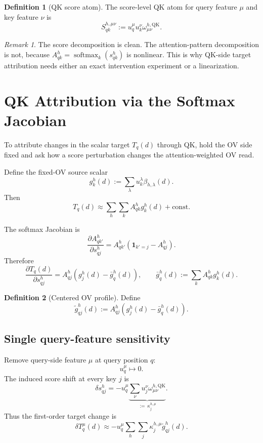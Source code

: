 \documentclass[11pt]{article}
\newcommand{\softmax}{\operatorname{softmax}}
\newcommand{\QK}{\mathrm{QK}}
\theoremstyle{definition}
\newtheorem{definition}{Definition}
\theoremstyle{plain}
\theoremstyle{remark}
\newtheorem{remark}{Remark}
\begin{document}
\begin{definition}[QK score atom]
The score-level QK atom for query feature \(\mu\) and key feature \(\nu\) is
\[
  S_{qk}^{h,\mu\nu}
  :=
  u_q^\mu u_k^\nu
  \omega_{\mu\nu}^{h,\QK}.
\]
\end{definition}

\begin{remark}
The score decomposition is clean.  The attention-pattern decomposition is not,
because \(A_{qk}^h = \softmax_k(s_{qk}^h)\) is nonlinear.  This is why QK-side
target attribution needs either an exact intervention experiment or a
linearization.
\end{remark}

\section{QK Attribution via the Softmax Jacobian}

To attribute changes in the scalar target \(T_q(d)\) through QK, hold the OV
side fixed and ask how a score perturbation changes the attention-weighted OV
read.

Define the fixed-OV source scalar
\[
  g_k^h(d)
  :=
  \sum_\lambda u_k^\lambda \beta_{h,\lambda}(d).
\]
Then
\[
  T_q(d)
  \approx
  \sum_h \sum_k A_{qk}^h g_k^h(d)
  +
  \mathrm{const}.
\]

The softmax Jacobian is
\[
  \frac{\partial A_{qk'}^h}{\partial s_{qj}^h}
  =
  A_{qk'}^h
  \left(
    \mathbf{1}_{k'=j} - A_{qj}^h
  \right).
\]
Therefore
\[
  \frac{\partial T_q(d)}{\partial s_{qj}^h}
  =
  A_{qj}^h
  \left(
    g_j^h(d) - \bar g_q^h(d)
  \right),
  \qquad
  \bar g_q^h(d) := \sum_k A_{qk}^h g_k^h(d).
\]

\begin{definition}[Centered OV profile]
Define
\[
  \widetilde g_{qj}^h(d)
  :=
  A_{qj}^h
  \left(
    g_j^h(d) - \bar g_q^h(d)
  \right).
\]
\end{definition}

\subsection{Single query-feature sensitivity}

Remove query-side feature \(\mu\) at query position \(q\):
\[
  u_q^\mu \mapsto 0.
\]
The induced score shift at every key \(j\) is
\[
  \delta s_{qj}^h
  =
  -
  u_q^\mu
  \underbrace{
  \sum_\nu u_j^\nu \omega_{\mu\nu}^{h,\QK}
  }_{:=\,\kappa_j^{h,\mu}}.
\]
Thus the first-order target change is
\[
  \delta T_q^\mu(d)
  \approx
  -
  u_q^\mu
  \sum_h \sum_j
  \kappa_j^{h,\mu}
  \widetilde g_{qj}^h(d).
\]
\end{document}
